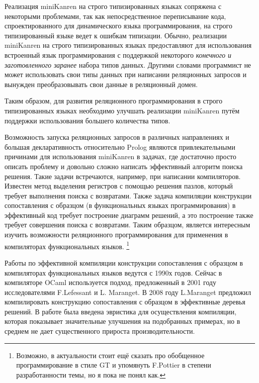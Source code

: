 Реализация miniKanren на строго типизированных языках сопряжена с некоторыми проблемами, так как непосредственное переписывание кода, спроектированного для динамического языка программирования, на строго типизированный языке ведет к ошибкам типизации. Обычно, реализации miniKanren на строго типизированных языках предоставляют для использования встроенный язык программирования с поддержкой некоторого \emph{конечного и заготовленного заранее} набора типов данных. Другими словами программист не может использовать свои типы данных при написании реляционных запросов и вынужден преобразовывать свои данные в реляционный домен.

Таким образом, для развития реляционного программирования в строго типизированных языках необходимо улучшать реализации miniKanren путём поддержки использования большего количества типов. 

Возможность запуска реляционных запросов в различных направлениях и большая декларативность относительно Prolog являются привлекательными причинами для использования miniKanren в задачах, где достаточно просто описать проблему и довольно сложно написать эффективный алгоритм поиска решения. Такие задачи встречаются, например, при написании компиляторов. Известен метод выделения регистров с помощью решения пазлов, который требует выполнения поиска с возвратами. Также задача компиляции конструкции сопоставления с образцом  (в функциональных языках программирования) в эффективный код требует построение диаграмм решений, а это построение также требует совершения поиска с возвратами. Таким образцом, является интересным изучить возможности реляционного программирования для применения в компиляторах функциональных языков.
\footnote{Возможно, в актуальности стоит ещё сказать про обобщенное программирование в стиле GT и упомянуть F.Pottier в степени разработанности темы, но я пока не понял как.}

{\progress}
Работы по эффективной компиляции конструкции сопоставления с образцом в компиляторах функциональных языков ведутся с 1990х годов. Сейчас в компиляторе OCaml используется подход, предложенный в 2001 году исследователями F.Lefessant и L. Maranget. В 2008 году L.Maranget предложил компилировать конструкцию сопоставления с образцом в эффективные деревья решений. В работе была введена эвристика для осуществления компиляции, которая показывает значительные улучшения на подобранных примерах, но в среднем не дает существенного прироста производительности.


